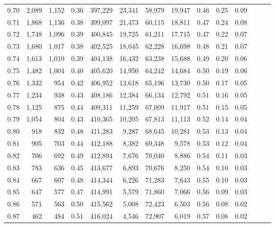 \begin{tabular}{rrrrrrrrrrrrrr}
0.70 &   2,089 &  1,152 &  0.36 &  397,229 &   23,341 &  58,979 &  19,947 &  0.46 &  0.25 &      0.09 \\
0.71 &   1,868 &  1,136 &  0.38 &  399,097 &   21,473 &  60,115 &  18,811 &  0.47 &  0.24 &      0.08 \\
0.72 &   1,748 &  1,096 &  0.39 &  400,845 &   19,725 &  61,211 &  17,715 &  0.47 &  0.22 &      0.07 \\
0.73 &   1,680 &  1,017 &  0.38 &  402,525 &   18,045 &  62,228 &  16,698 &  0.48 &  0.21 &      0.07 \\
0.74 &   1,613 &  1,010 &  0.39 &  404,138 &   16,432 &  63,238 &  15,688 &  0.49 &  0.20 &      0.06 \\
0.75 &   1,482 &  1,004 &  0.40 &  405,620 &   14,950 &  64,242 &  14,684 &  0.50 &  0.19 &      0.06 \\
0.76 &   1,332 &    954 &  0.42 &  406,952 &   13,618 &  65,196 &  13,730 &  0.50 &  0.17 &      0.05 \\
0.77 &   1,234 &    938 &  0.43 &  408,186 &   12,384 &  66,134 &  12,792 &  0.51 &  0.16 &      0.05 \\
0.78 &   1,125 &    875 &  0.44 &  409,311 &   11,259 &  67,009 &  11,917 &  0.51 &  0.15 &      0.05 \\
0.79 &   1,054 &    804 &  0.43 &  410,365 &   10,205 &  67,813 &  11,113 &  0.52 &  0.14 &      0.04 \\
0.80 &     918 &    832 &  0.48 &  411,283 &    9,287 &  68,645 &  10,281 &  0.53 &  0.13 &      0.04 \\
0.81 &     905 &    703 &  0.44 &  412,188 &    8,382 &  69,348 &   9,578 &  0.53 &  0.12 &      0.04 \\
0.82 &     706 &    692 &  0.49 &  412,894 &    7,676 &  70,040 &   8,886 &  0.54 &  0.11 &      0.03 \\
0.83 &     783 &    636 &  0.45 &  413,677 &    6,893 &  70,676 &   8,250 &  0.54 &  0.10 &      0.03 \\
0.84 &     667 &    607 &  0.48 &  414,344 &    6,226 &  71,283 &   7,643 &  0.55 &  0.10 &      0.03 \\
0.85 &     647 &    577 &  0.47 &  414,991 &    5,579 &  71,860 &   7,066 &  0.56 &  0.09 &      0.03 \\
0.86 &     571 &    563 &  0.50 &  415,562 &    5,008 &  72,423 &   6,503 &  0.56 &  0.08 &      0.02 \\
0.87 &     462 &    484 &  0.51 &  416,024 &    4,546 &  72,907 &   6,019 &  0.57 &  0.08 &      0.02 \\

\end{tabular}
